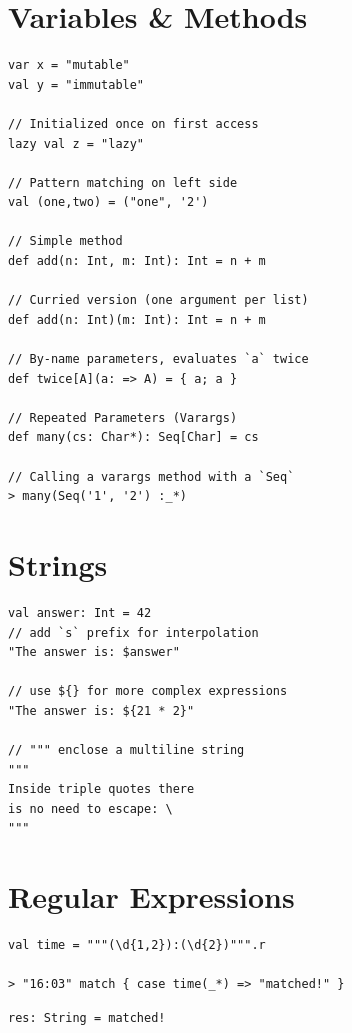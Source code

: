 \documentclass[10pt,landscape,a4paper]{article}
\begin{document}

\footnotesize
\begin{multicols*}{4}

  \section{Variables \& Methods}
\begin{verbatim}
var x = "mutable"
val y = "immutable"

// Initialized once on first access
lazy val z = "lazy"

// Pattern matching on left side
val (one,two) = ("one", '2')

// Simple method
def add(n: Int, m: Int): Int = n + m

// Curried version (one argument per list)
def add(n: Int)(m: Int): Int = n + m

// By-name parameters, evaluates `a` twice
def twice[A](a: => A) = { a; a }

// Repeated Parameters (Varargs)
def many(cs: Char*): Seq[Char] = cs

// Calling a varargs method with a `Seq`
> many(Seq('1', '2') :_*)
\end{verbatim}

  \section{Strings}

\begin{verbatim}
val answer: Int = 42
// add `s` prefix for interpolation
"The answer is: $answer"

// use ${} for more complex expressions
"The answer is: ${21 * 2}"

// """ enclose a multiline string
"""
Inside triple quotes there
is no need to escape: \
"""
\end{verbatim}

  \section{Regular Expressions}

\begin{verbatim}
val time = """(\d{1,2}):(\d{2})""".r

> "16:03" match { case time(_*) => "matched!" }
\end{verbatim}
\begin{verbatim}
res: String = matched!
\end{verbatim}


\end{multicols*}
\end{document}
